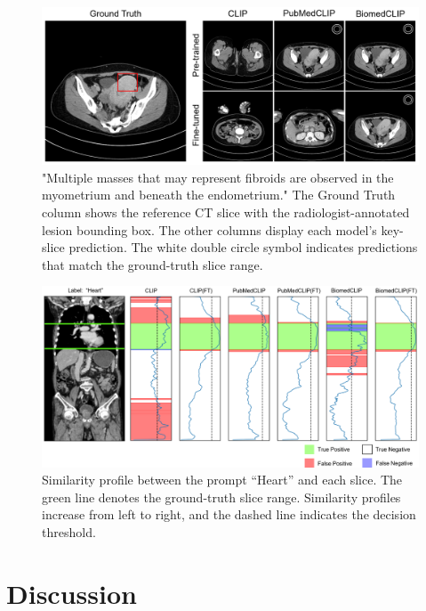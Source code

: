 \documentclass[bioengineering,article,submit,pdftex,moreauthors]{Definitions/mdpi}
\begin{document}
\begin{figure}[ht]
  \centering
  \includegraphics[width=1\textwidth]{./figures/figure2_4.png}
  \caption{"Multiple masses that may represent fibroids are observed in the myometrium and beneath the endometrium."
  The Ground Truth column shows the reference CT slice with the radiologist-annotated lesion bounding box.
  The other columns display each model’s key-slice prediction.
  The white double circle symbol indicates predictions that match the ground-truth slice range.
  }
  \label{fig:lesion_aware_results}
\end{figure}


\begin{figure}[ht]
  \centering
  \includegraphics[width=1\textwidth]{./figures/figure3_4.png}
  \caption{Similarity profile between the prompt “Heart” and each slice. 
  The green line denotes the ground-truth slice range. 
  Similarity profiles increase from left to right, and the dashed line indicates the decision threshold. 
  }
  \label{fig:organ_aware_results}
\end{figure}

\section{Discussion}
\end{document}
